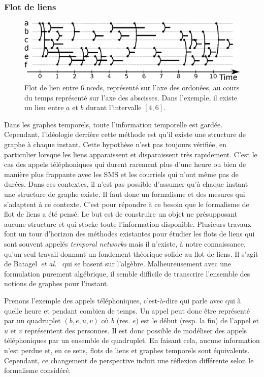 \subsubsection{Flot de liens}
\begin{figure}[h]
\centering
\includegraphics[width=0.9\linewidth]{img/Intro/Flot_de_liens.eps}
\caption{Flot de lien entre $6$ n\oe ds, représenté sur l'axe des ordonées, au cours du temps représenté sur l'axe des abscisses.
Dans l'exemple, il existe un lien entre $a$ et $b$ durant l'intervalle $[4,6]$.
}
\label{fig:exemple_Flot_de_liens}
\end{figure}
Dans les graphes temporels, toute l'information temporelle est gardée.
Cependant, l'idéologie derrière cette méthode est qu'il existe une structure de graphe à chaque instant.
Cette hypothèse n'est pas toujours vérifiée, en particulier lorsque les liens apparaissent et disparaissent très rapidement.
C'est le cas des appels téléphoniques qui durent rarement plus d'une heure ou bien de manière plus frappante avec les SMS et les courriels qui n'ont même pas de durées.
Dans ces contextes, il n'est pas possible d'assumer qu'à chaque instant une structure de graphe existe.
Il faut donc un formalisme et des mesures qui s'adaptent à ce contexte.
C'est pour répondre à ce besoin que le formalisme de flot de liens a été pensé.
Le but est de construire un objet ne présupposant aucune structure et qui stocke toute l'information disponible.
Plusieurs travaux~\cite{Holme2013a,Holme2015b,Holme2015} font un tour d'horizon des méthodes existantes pour étudier les flots de liens qui sont souvent appelés \emph{temporal networks} mais il n'existe, à notre connaissance, qu'un seul travail donnant un fondement théorique solide au flot de liens.
Il s'agit de Batagel~\emph{et al.}~\cite{Batagelj2015} qui se basent sur l'algèbre.
Malheureusement avec une formulation purement algébrique, il semble difficile de transcrire l'ensemble des notions de graphes pour l'instant.
\bigskip

Prenons l'exemple des appels téléphoniques, c'est-à-dire qui parle avec qui à quelle heure et pendant combien de temps.
Un appel peut donc être représenté par un quadruplet $(b,e,u,v)$ où $b$ (res. $e$) est le début (resp. la fin) de l'appel et $u$ et $v$ représentent des personnes.
Il est donc possible de modéliser des appels téléphoniques par un ensemble de quadruplet.
En faisant cela, aucune information n'est perdue et, en ce sens, flots de liens et graphes temporels sont équivalents. 
Cependant, ce changement de perspective induit une réflexion différente selon le formalisme considéré.


